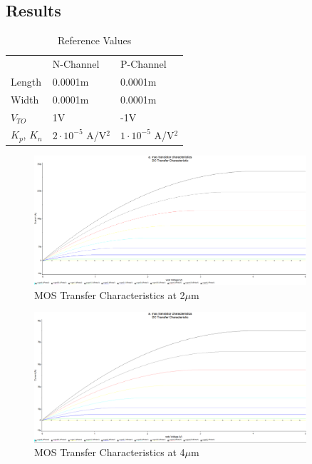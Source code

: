 \documentclass[12pt]{article}
\begin{document}
\subsection{Results}
\begin{table}[H]
\centering
\begin{tabular}{lll}
       & N-Channel                                     & P-Channel                                      \\
Length & 0.0001m                                       & 0.0001m                                        \\
Width  & 0.0001m                                       & 0.0001m                                        \\
$V_{TO}$    & 1V                                            & -1V                                            \\
$K_p$, $K_n$  & $2\cdot10^{-5}$ A/V$^{2}$ & $1\cdot10^{-5}$ A/V$^{2}$
\end{tabular}
\caption{Reference Values}
\end{table}

\begin{figure}[H]
\centering
\includegraphics[width=0.9\textwidth]{a11.PNG}
\caption{MOS Transfer Characteristics at 2$\mu$m}
\end{figure}

\begin{figure}[H]
\centering
\includegraphics[width=0.9\textwidth]{a12.PNG}
\caption{MOS Transfer Characteristics at 4$\mu$m}
\end{figure}
\end{document}
